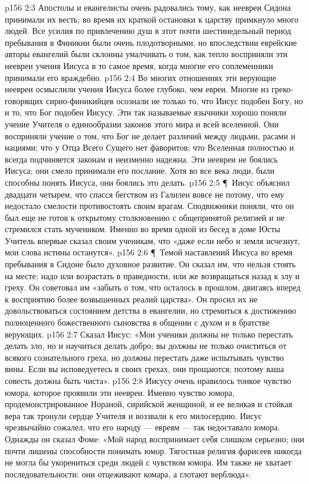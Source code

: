 \vs p156 2:3 Апостолы и евангелисты очень радовались тому, как неевреи Сидона принимали их весть; во время их краткой остановки к царству примкнуло много людей. Все усилия по привлечению душ в этот почти шестинедельный период пребывания в Финикии были очень плодотворными, но впоследствии еврейские авторы евангелий были склонны умалчивать о том, как тепло восприняли эти неевреи учения Иисуса в то самое время, когда многие его соплеменники принимали его враждебно.
\vs p156 2:4 Во многих отношениях эти верующие неевреи осмыслили учения Иисуса более глубоко, чем евреи. Многие из греко\hyp{}говорящих сирио\hyp{}финикийцев осознали не только то, что Иисус подобен Богу, но и то, что Бог подобен Иисусу. Эти так называемые язычники хорошо поняли учение Учителя о единообразии законов этого мира и всей вселенной. Они восприняли учение о том, что Бог не делает различий между людьми, расами и нациями; что у Отца Всего Сущего нет фаворитов; что Вселенная полностью и всегда подчиняется законам и неизменно надежна. Эти неевреи не боялись Иисуса; они смело принимали его послание. Хотя во все века люди, были способны понять Иисуса, они боялись это делать.
\vs p156 2:5 \P\ Иисус объяснил двадцати четырем, что спасся бегством из Галилеи вовсе не потому, что ему недостало смелости противостоять своим врагам. Сподвижники поняли, что он был еще не готов к открытому столкновению с общепринятой религией и не стремился стать мучеником. Именно во время одной из бесед в доме Юсты Учитель впервые сказал своим ученикам, что «даже если небо и земля исчезнут, мои слова истины останутся».
\vs p156 2:6 \P\ Темой наставлений Иисуса во время пребывания в Сидоне было духовное развитие. Он сказал им, что нельзя стоять на месте; надо или возрастать в праведности, или же возвращаться назад к злу и греху. Он советовал им «забыть о том, что осталось в прошлом, двигаясь вперед к восприятию более возвышенных реалий царства». Он просил их не довольствоваться состоянием детства в евангелии, но стремиться к достижению полноценного божественного сыновства в общении с духом и в братстве верующих.
\vs p156 2:7 Сказал Иисус: «Мои ученики должны не только перестать делать зло, но и научиться делать добро; вы должны не только очиститься от всякого сознательного греха, но должны перестать даже испытывать чувство вины. Если вы исповедуетесь в своих грехах, они прощаются; поэтому ваша совесть должна быть чиста».
\vs p156 2:8 Иисусу очень нравилось тонкое чувство юмора, которое проявили эти неевреи. Именно чувство юмора, продемонстрированное Нораной, сирийской женщиной, и ее великая и стойкая вера так тронули сердце Учителя и воззвали к его милосердию. Иисус чрезвычайно сожалел, что его народу --- евреям --- так недоставало юмора. Однажды он сказал Фоме: «Мой народ воспринимает себя слишком серьезно; они почти лишены способности понимать юмор. Тягостная религия фарисеев никогда не могла бы укорениться среди людей с чувством юмора. Им также не хватает последовательности: они отцеживают комара, а глотают верблюда».
